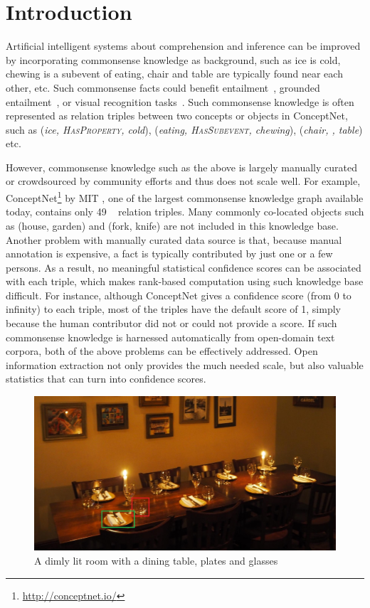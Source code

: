 \section{Introduction}
Artificial intelligent systems about comprehension and inference 
can be improved by incorporating commonsense knowledge as background, 
such as ice is cold, 
chewing is a subevent of eating, 
chair and table are typically found near each other, etc. 
Such commonsense facts could benefit entailment~\cite{dagan2009recognizing}, grounded entailment~\cite{bowman2015large}, or visual recognition tasks~\cite{zhu2014reasoning}.
Such commonsense knowledge is often represented as relation triples
between two concepts or objects in ConceptNet, 
such as (\textit{ice, \textsc{HasProperty}, cold}), 
(\textit{eating, \textsc{HasSubevent}, chewing}), 
(\textit{chair, \lnear, table}) etc. 

However, commonsense knowledge such as the above is largely manually curated
or crowdsourced by community efforts and thus does not scale well.
For example, ConceptNet\footnote{\url{http://conceptnet.io/}} by MIT \cite{speer2012representing}, one of the largest commonsense
knowledge graph available today, contains only 49 \lnear~
relation triples. 
Many commonly co-located objects such as (house, garden) and 
(fork, knife) are not included in this knowledge base. 
Another problem with manually curated data source is that, because manual
annotation is expensive, a fact is typically contributed by just one 
or a few persons. 
As a result, no meaningful statistical confidence scores can be
associated with each triple, which makes rank-based 
computation using such knowledge base difficult. 
For instance, although ConceptNet gives a confidence
score (from 0 to infinity) to each triple, most of the triples have the default
score of 1, simply because the human contributor did not or could not 
provide a score. 
If such commonsense knowledge is harnessed automatically
from open-domain text corpora, both of the above problems can be 
effectively addressed. 
Open information extraction not only provides the much needed scale,
but also valuable statistics that can turn into confidence scores.

\begin{figure}[th]
\center
\includegraphics[width=\columnwidth]{dim-table.jpg}
\caption{A dimly lit room with a dining table, plates and glasses}
\label{fig:dim}
\end{figure}

